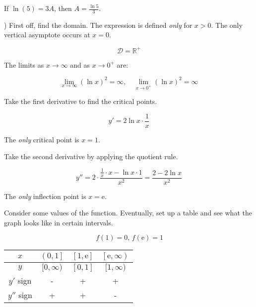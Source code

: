 \documentclass{article}
\begin{document}
\noindent If $\ln(5) = 3A$, then $\boxed{A =\frac{\ln5}3}$.

\hfill

) First off, find the domain. The expression is defined \textit{only} for $x>0$. The only vertical asymptote occurs at $x=0$.

\begin{equation*}\mathcal{D} = \mathbb{R}^+\end{equation*}

\hfill

\noindent The limits as $x\to\infty$ and as $x\to0^+$ are:

\begin{equation*}\lim_{x\to \infty}(\ln x)^2=\infty,\quad \lim_{x\to0^+}(\ln x)^2=\infty \end{equation*}

\hfill

\noindent Take the first derivative to find the critical points.

\begin{equation*}y'=2\ln x\cdot\frac1x\end{equation*}

\hfill

\noindent The \textit{only} critical point is $x=1$.

\hfill

\noindent Take the second derivative by applying the quotient rule.

\begin{equation*}y''=2\cdot\frac{\frac1x \cdot x-\ln x \cdot 1}{x^2}=\frac{2-2\ln x}{x^2}\end{equation*}

\hfill

\noindent The \textit{only} inflection point is $x=\mathrm{e}$.

\hfill

\noindent Consider some values of the function. Eventually, set up a table and see what the graph looks like in certain intervals.

\begin{equation*}\,f\left(1\right)=0,\,f(\mathrm{e})=1\end{equation*}

\begin{center}
    \large
    \begin{tabular}{ |c| c c c| } 
    \hline
        $x$ & $\left(0, 1\right]$ & $\left[1, \mathrm{e}\right]$&$\left[\mathrm{e}, \infty\right)$  \\
        \hline
        $y$ & $[0, \infty)$ &$[0,1]$ & $[1, \infty)$ \\
        \hline
        $y'$ sign & - & + & + \\
        \hline
        $y''$ sign & + & + & - \\
        \hline
    \end{tabular}
\end{center}
\end{document}
